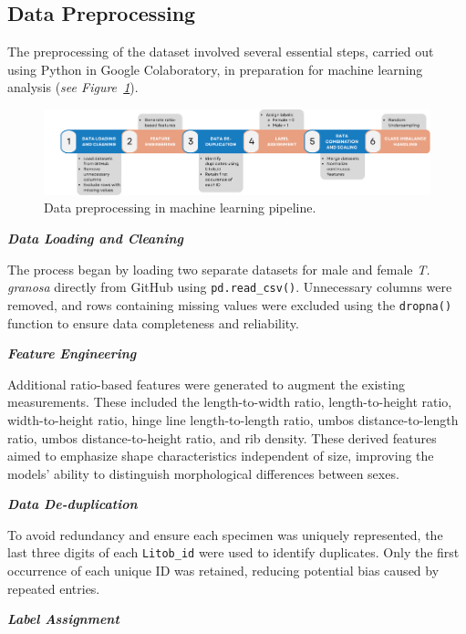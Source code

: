 \subsection{Data Preprocessing}
\label{sec:pre-processing}

The preprocessing of the dataset involved several essential steps, carried out using Python in Google Colaboratory, in preparation for machine learning analysis (\textit{see Figure~\ref{fig:pipeline}}).

\begin{figure}[!htbp]
	\centering
	\includegraphics[width=1\textwidth]{figures/pipeline.png}
	\caption{Data preprocessing in machine learning pipeline.}
	\label{fig:pipeline}
\end{figure}

\textbf{\textit{Data Loading and Cleaning}}

The process began by loading two separate datasets for male and female \textit{T. granosa} directly from GitHub using \texttt{pd.read\_csv()}. Unnecessary columns were removed, and rows containing missing values were excluded using the \texttt{dropna()} function to ensure data completeness and reliability.

\textbf{\textit{Feature Engineering}}

Additional ratio-based features were generated to augment the existing measurements. These included the length-to-width ratio, length-to-height ratio, width-to-height ratio, hinge line length-to-length ratio, umbos distance-to-length ratio, umbos distance-to-height ratio, and rib density. These derived features aimed to emphasize shape characteristics independent of size, improving the models' ability to distinguish morphological differences between sexes.

\textbf{\textit{Data De-duplication}}

To avoid redundancy and ensure each specimen was uniquely represented, the last three digits of each \texttt{Litob\_id} were used to identify duplicates. Only the first occurrence of each unique ID was retained, reducing potential bias caused by repeated entries.

\textbf{\textit{Label Assignment}}


